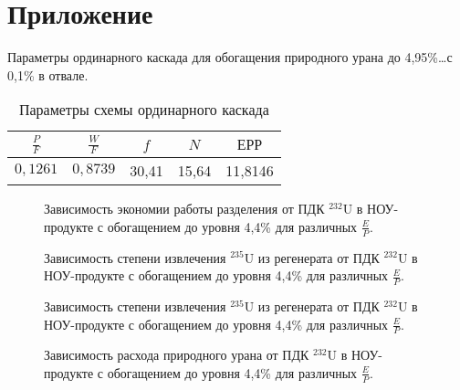 \chapter*{Приложение}             %


Параметры ординарного каскада для обогащения природного урана до 4,95\%\dots с 0,1\% в отвале.


\begin{table}[h]
    \centering
    \normalsize\begin{tabulary}{1.0\textwidth}{|c|c|c|c|c|}
        \hline $\frac{P}{F}$ & $\frac{W}{F}$ & $f$ & $N$ & $\textit{ЕРР}$\\
        \hline $0,1261$ & $0,8739$ & 30,41 & 15,64 & 11,8146\\\hline
    \end{tabulary}
\caption{Параметры схемы ординарного каскада}\label{ordninary495}
\end{table}





\begin{figure}
    \centering
    \begin{minipage}{.5\textwidth}
      \centering
      
      \caption{{Зависимость экономии работы разделения от ПДК $^{232}$U в НОУ-продукте с обогащением до уровня 4,4\% для различных $\frac{E}{P}$.{\label{sw44}}}}
    \end{minipage}%
    \begin{minipage}{.5\textwidth}
      \centering
      
      \caption{{Зависимость степени извлечения $^{235}$U из регенерата от ПДК $^{232}$U в НОУ-продукте с обогащением до уровня 4,4\% для различных $\frac{E}{P}$.{\label{exR44}}}}
    \end{minipage}
\end{figure}


\begin{figure}
    \centering
    \begin{minipage}{.5\textwidth}
      \centering
      
\caption{{Зависимость степени извлечения $^{235}$U из регенерата от ПДК $^{232}$U в НОУ-продукте с обогащением до уровня 4,4\% для различных $\frac{E}{P}$.{\label{exR44}}}}
    \end{minipage}%
    \begin{minipage}{.5\textwidth}
      \centering
      
\caption{{Зависимость расхода природного урана от ПДК $^{232}$U в НОУ-продукте с обогащением до уровня 4,4\% для различных $\frac{E}{P}$.{\label{F0R44}}}}
    \end{minipage}
\end{figure}



